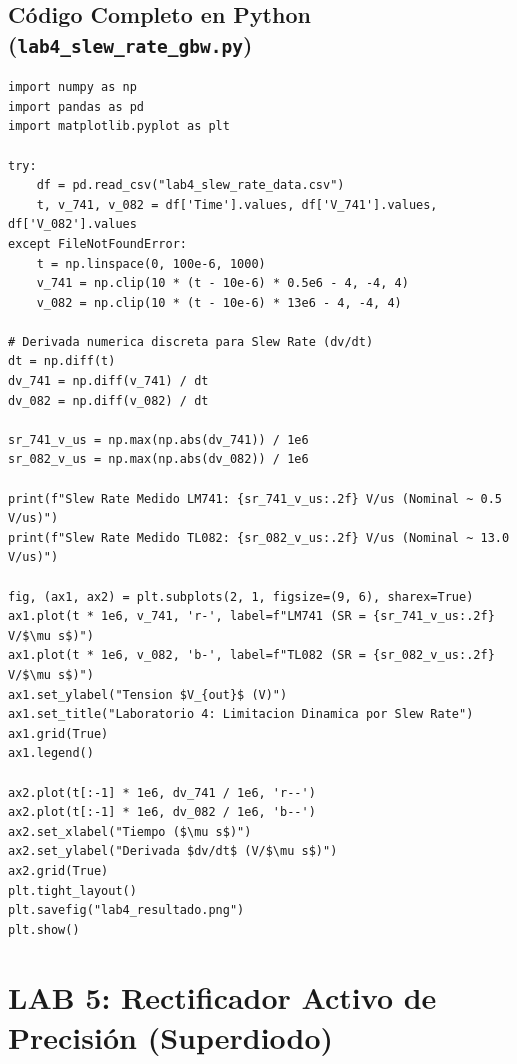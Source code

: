 \documentclass[10pt,a4paper,twoside]{article}
\begin{document}
\subsection{Código Completo en Python (\texttt{lab4\_slew\_rate\_gbw.py})}
\begin{lstlisting}
import numpy as np
import pandas as pd
import matplotlib.pyplot as plt

try:
    df = pd.read_csv("lab4_slew_rate_data.csv")
    t, v_741, v_082 = df['Time'].values, df['V_741'].values, df['V_082'].values
except FileNotFoundError:
    t = np.linspace(0, 100e-6, 1000)
    v_741 = np.clip(10 * (t - 10e-6) * 0.5e6 - 4, -4, 4)
    v_082 = np.clip(10 * (t - 10e-6) * 13e6 - 4, -4, 4)

# Derivada numerica discreta para Slew Rate (dv/dt)
dt = np.diff(t)
dv_741 = np.diff(v_741) / dt
dv_082 = np.diff(v_082) / dt

sr_741_v_us = np.max(np.abs(dv_741)) / 1e6
sr_082_v_us = np.max(np.abs(dv_082)) / 1e6

print(f"Slew Rate Medido LM741: {sr_741_v_us:.2f} V/us (Nominal ~ 0.5 V/us)")
print(f"Slew Rate Medido TL082: {sr_082_v_us:.2f} V/us (Nominal ~ 13.0 V/us)")

fig, (ax1, ax2) = plt.subplots(2, 1, figsize=(9, 6), sharex=True)
ax1.plot(t * 1e6, v_741, 'r-', label=f"LM741 (SR = {sr_741_v_us:.2f} V/$\mu s$)")
ax1.plot(t * 1e6, v_082, 'b-', label=f"TL082 (SR = {sr_082_v_us:.2f} V/$\mu s$)")
ax1.set_ylabel("Tension $V_{out}$ (V)")
ax1.set_title("Laboratorio 4: Limitacion Dinamica por Slew Rate")
ax1.grid(True)
ax1.legend()

ax2.plot(t[:-1] * 1e6, dv_741 / 1e6, 'r--')
ax2.plot(t[:-1] * 1e6, dv_082 / 1e6, 'b--')
ax2.set_xlabel("Tiempo ($\mu s$)")
ax2.set_ylabel("Derivada $dv/dt$ (V/$\mu s$)")
ax2.grid(True)
plt.tight_layout()
plt.savefig("lab4_resultado.png")
plt.show()
\end{lstlisting}

\newpage
\section{LAB 5: Rectificador Activo de Precisión (Superdiodo)}
\end{document}
